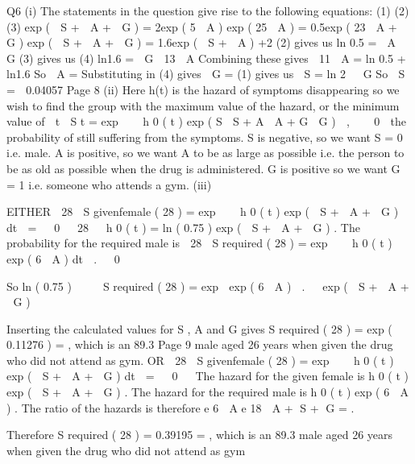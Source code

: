 \documentclass[a4paper,12pt]{article}
\begin{document}
Q6
(i)
The statements in the question give rise to the following equations:
(1)
(2)
(3)
exp (  S \;+  A \;+\;  G ) \;=\; 2exp ( 5  A )
exp ( 25  A ) \;=\; 0.5exp ( 23  A \;+\;  G )
exp (  S \;+  A \;+\;  G ) \;=\; 1.6exp (  S \;+  A )
+2
(2) gives us
ln 0.5 \;=  A   G
(3) gives us
(4)
ln1.6 \;=\;  G  13  A
Combining these gives
 11  A \;=\; ln 0.5 \;+\; ln1.6
So  A \;= %
Substituting in (4) gives  G \;= %
(1) gives us
 S \;=\; ln 2   G
So  S \;=\;  0.04057
Page 8
(ii)
Here h(t) is the hazard of symptoms disappearing so we wish to find
the group with the maximum value of the hazard, or the minimum
value of
 t

S t \;=\; exp    h 0 ( t ) exp ( S  S \;+\; A  A \;+\; G  G )  ,


 0

the probability of still suffering from the symptoms. %
\beta S is negative, so we want S = 0 i.e. male. 
\beta A is positive, so we want A to be as large as possible i.e. the person to
be as old as possible when the drug is administered. %
\beta G is positive so we want G = 1 i.e. someone who attends a gym.
(iii)


EITHER
 28

S givenfemale ( 28 ) \;=\; exp    h 0 ( t ) exp (  S \;+  A \;+\;  G ) dt  \;=
  0
 
28
  h 0 ( t ) \;=
ln ( 0.75 )
exp (  S \;+  A \;+\;  G )
.
The probability for the required male is
 28

S required ( 28 ) \;=\; exp    h 0 ( t ) exp ( 6  A ) dt  .
  0
 

So
ln ( 0.75 )
 
 
S required ( 28 ) \;=\; exp 
exp ( 6  A )  .
  exp (  S \;+  A \;+\;  G )
 

Inserting the calculated values for \beta S , \beta A and \beta G gives
S required ( 28 ) \;=\; exp (  0.11276 ) \;= ,
which is an 89.3%
Page 9%
male aged 26 years when given the drug who did not attend as gym.
OR
 28

S givenfemale ( 28 ) \;=\; exp    h 0 ( t ) exp (  S \;+  A \;+\;  G ) dt  \;=
  0
  %
The hazard for the given female is h 0 ( t ) exp (  S \;+  A \;+\;  G ) . %
The hazard for the required male is h 0 ( t ) exp ( 6  A ) . 
The ratio of the hazards is therefore
e 6  A
e 18  A \;+\; S \;+\; G
\;= .

Therefore
S required ( 28 ) \;= 0.39195 \;= ,
which is an 89.3%
male aged 26 years when given the drug who did not attend as gym
\end{document}
